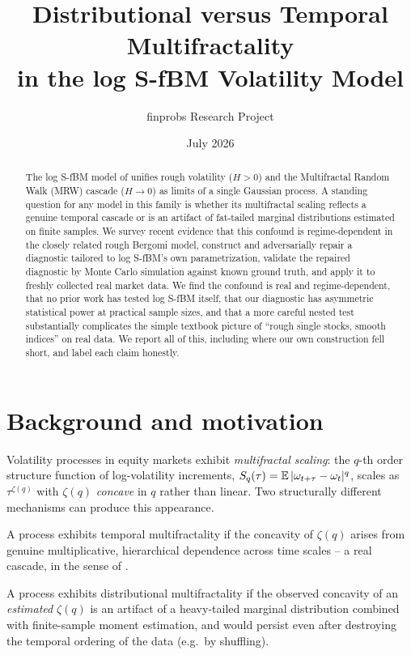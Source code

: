 \documentclass[11pt]{article}
\title{Distributional versus Temporal Multifractality\\ in the log S-fBM Volatility Model}
\author{finprobs Research Project}
\date{July 2026}
\begin{document}
\maketitle

\begin{abstract}
The log S-fBM model of \citet{wu2022rough} unifies rough volatility ($H>0$) and the Multifractal Random Walk (MRW) cascade ($H\to0$) as limits of a single Gaussian process. A standing question for any model in this family is whether its multifractal scaling reflects a genuine temporal cascade or is an artifact of fat-tailed marginal distributions estimated on finite samples. We survey recent evidence that this confound is regime-dependent in the closely related rough Bergomi model, construct and adversarially repair a diagnostic tailored to log S-fBM's own parametrization, validate the repaired diagnostic by Monte Carlo simulation against known ground truth, and apply it to freshly collected real market data. We find the confound is real and regime-dependent, that no prior work has tested log S-fBM itself, that our diagnostic has asymmetric statistical power at practical sample sizes, and that a more careful nested test substantially complicates the simple textbook picture of ``rough single stocks, smooth indices'' on real data. We report all of this, including where our own construction fell short, and label each claim honestly.
\end{abstract}

\section{Background and motivation}

Volatility processes in equity markets exhibit \emph{multifractal scaling}: the $q$-th order structure function of log-volatility increments, $S_q(\tau) = \operatorname{\mathbb{E}}|\omega_{t+\tau}-\omega_t|^q$, scales as $\tau^{\zeta(q)}$ with $\zeta(q)$ \emph{concave} in $q$ rather than linear. Two structurally different mechanisms can produce this appearance.

\begin{definition}
A process exhibits temporal multifractality if the concavity of $\zeta(q)$ arises from genuine multiplicative, hierarchical dependence across time scales -- a real cascade, in the sense of \citet{bacry2003multifractal}.
\end{definition}

\begin{definition}
A process exhibits distributional multifractality if the observed concavity of an \emph{estimated} $\zeta(q)$ is an artifact of a heavy-tailed marginal distribution combined with finite-sample moment estimation, and would persist even after destroying the temporal ordering of the data (e.g.\ by shuffling).
\end{definition}
\end{document}
